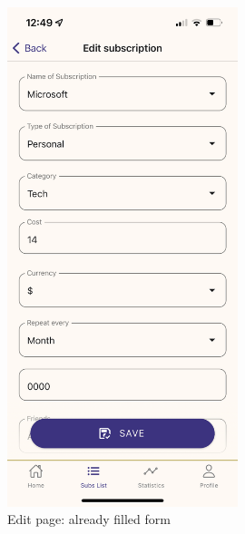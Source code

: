 \documentclass[12pt]{article}
\begin{document}
\begin{figure}[h!]
    \centering
    \begin{minipage}[c]{0.45\textwidth}
        \centering
        \includegraphics[width=0.6\textwidth, clip]{../../assets/smartphone/edit.PNG}
        \caption{Edit page: already filled form}
        \label{fig:edit}
    \end{minipage}\hspace{1cm}%
    \begin{minipage}[c]{0.45\textwidth}
        \centering

\end{minipage}
\end{figure}
\end{document}
